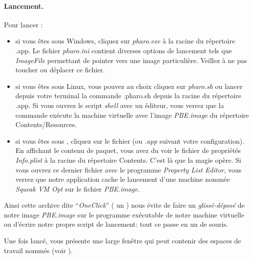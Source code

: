 \documentclass[a4paper,10pt,twoside]{book}
\begin{document}

\paragraph{Lancement.} Pour lancer \pharo:

\begin{itemize}
\item si vous êtes sous Windows, cliquez sur \textit{pharo.exe} à la racine du répertoire \textsf{\pharooneclick{}.app}.
Le fichier \textit{pharo.ini} contient diverses options de lancement tels que \textit{ImageFile} permettant de pointer vers une image particulière. Veillez à ne pas toucher ou déplacer ce fichier.
\item  si vous êtes sous Linux, vous pouvez au choix cliquez sur \textit{pharo.sh} ou lancer depuis votre terminal la commande \textsf{.\/pharo.sh} depuis la racine du répertoire \textsf{\pharooneclick{}.app}. Si vous ouvrez le script \emph{shell} avec un éditeur, vous verrez que la commande exécute la machine virtuelle avec l'image \emph{PBE.image} du répertoire \textsf{Contents/Resources}.
\item si vous êtes sous \macosx, cliquez sur le fichier \textit{\pharooneclick} (ou \textit{\pharooneclick{}.app} suivant votre configuration). En affichant le contenu de paquet, vous avez du voir le fichier de propriétés \emph{Info.plist} à la racine du répertoire \textsf{Contents}. C'est là que la magie opère. Si vous ouvrez ce dernier fichier avec le programme \emph{Property List Editor}, vous verrez que notre application \textit{\pharooneclick} cache le lancement d'une machine nommée \emph{Squeak VM Opt} sur le fichier \emph{PBE.image}.
\end{itemize}

Ainsi cette archive dite ``\emph{OneClick}'' (\ie{} un \emph{\clickbtn{}}) nous évite de faire un \emph{glissé-déposé} de notre image \emph{PBE.image} sur le programme exécutable de notre machine virtuelle ou d'écrire notre propre script de lancement: tout ce passe en un \clickbtn de souris.

Une fois lancé, \pharo vous présente une large fenêtre qui peut contenir des
espaces de travail nommés  (voir ).

\end{document}
